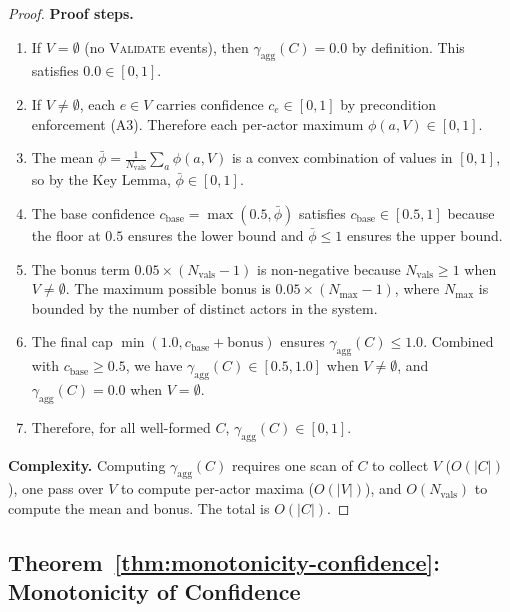 \begin{proof}
\textbf{Proof steps.}
\begin{enumerate}[label=Step~\arabic*:,leftmargin=2em]
    \item If $V = \emptyset$ (no \textsc{Validate} events), then $\gamma_{\text{agg}}(C) = 0.0$ by definition. This satisfies $0.0 \in [0, 1]$.
    \item If $V \neq \emptyset$, each $e \in V$ carries confidence $c_e \in [0, 1]$ by precondition enforcement (A3). Therefore each per-actor maximum $\phi(a, V) \in [0, 1]$.
    \item The mean $\bar{\phi} = \frac{1}{N_{\text{vals}}} \sum_a \phi(a, V)$ is a convex combination of values in $[0, 1]$, so by the Key Lemma, $\bar{\phi} \in [0, 1]$.
    \item The base confidence $c_{\text{base}} = \max(0.5, \bar{\phi})$ satisfies $c_{\text{base}} \in [0.5, 1]$ because the floor at $0.5$ ensures the lower bound and $\bar{\phi} \leq 1$ ensures the upper bound.
    \item The bonus term $0.05 \times (N_{\text{vals}} - 1)$ is non-negative because $N_{\text{vals}} \geq 1$ when $V \neq \emptyset$. The maximum possible bonus is $0.05 \times (N_{\text{max}} - 1)$, where $N_{\text{max}}$ is bounded by the number of distinct actors in the system.
    \item The final cap $\min(1.0, c_{\text{base}} + \text{bonus})$ ensures $\gamma_{\text{agg}}(C) \leq 1.0$. Combined with $c_{\text{base}} \geq 0.5$, we have $\gamma_{\text{agg}}(C) \in [0.5, 1.0]$ when $V \neq \emptyset$, and $\gamma_{\text{agg}}(C) = 0.0$ when $V = \emptyset$.
    \item Therefore, for all well-formed $C$, $\gamma_{\text{agg}}(C) \in [0, 1]$.
\end{enumerate}

\textbf{Complexity.} Computing $\gamma_{\text{agg}}(C)$ requires one scan of $C$ to collect $V$ ($O(|C|)$), one pass over $V$ to compute per-actor maxima ($O(|V|)$), and $O(N_{\text{vals}})$ to compute the mean and bonus. The total is $O(|C|)$.
\end{proof}

\subsection{Theorem~\ref{thm:monotonicity-confidence}: Monotonicity of Confidence}

